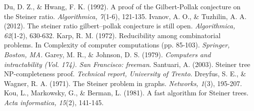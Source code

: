 \documentclass[12pt,uplatex,dvipdfmx,titlepage]{article}
\theoremstyle{case}
\begin{document}
\newpage
    \begin{thebibliography}{10}
         Du, D. Z., \& Hwang, F. K. (1992). A proof of the Gilbert-Pollak conjecture on the Steiner ratio. \emph{Algorithmica, 7}(1-6), 121-135.
         Ivanov, A. O., \& Tuzhilin, A. A. (2012). The steiner ratio gilbert–pollak conjecture is still open. \emph{Algorithmica, 62}(1-2), 630-632.
         Karp, R. M. (1972). Reducibility among combinatorial problems. In Complexity of computer computations (pp. 85-103). \emph{Springer, Boston, MA.}
         Garey, M. R., \& Johnson, D. S. (1979). \emph{Computers and intractability (Vol. 174). San Francisco: freeman}.
         Santuari, A. (2003). Steiner tree NP-completeness proof. \emph{Technical report, University of Trento}.
         Dreyfus, S. E., \& Wagner, R. A. (1971). The Steiner problem in graphs. \emph{Networks, 1}(3), 195-207.
         Kou, L., Markowsky, G., \& Berman, L. (1981). A fast algorithm for Steiner trees. \emph{Acta informatica, 15}(2), 141-145.
    \end{thebibliography}
\end{document}
